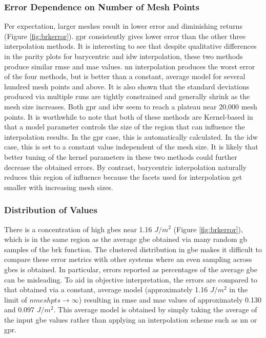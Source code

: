 \documentclass[preprint,12pt]{elsarticle}
\begin{document}
\subsubsection{Error Dependence on Number of Mesh Points} \label{results:general:mesh size}
Per expectation, larger meshes result in lower error and diminishing returns (Figure \ref{fig:brkerror}). \Gls{gpr} consistently gives lower error than the other three interpolation methods. It is interesting to see that despite qualitative differences in the parity plots for barycentric and \gls{idw} interpolation, these two methods produce similar \gls{rmse} and \gls{mae} values. \Gls{nn} interpolation produces the worst error of the four methods, but is better than a constant, average model for several hundred mesh points and above. It is also shown that the standard deviations produced via multiple runs are tightly constrained and generally shrink as the mesh size increases. Both \gls{gpr} and \gls{idw} seem to reach a plateau near 20,000 mesh points. It is worthwhile to note that both of these methods are Kernel-based in that a model parameter controls the size of the region that can influence the interpolation results. In the \gls{gpr} case, this is automatically calculated. In the \gls{idw} case, this is set to a constant value independent of the mesh size. It is likely that better tuning of the kernel parameters in these two methods could further decrease the obtained errors. By contrast, barycentric interpolation naturally reduces this region of influence because the facets used for interpolation get smaller with increasing mesh sizes.

\subsubsection{Distribution of  Values} \label{results:general:distribution}
There is a concentration of high \glspl{gbe} near 1.16 $J/m^2$ (Figure \ref{fig:brkerror}), which is in the same region as the average \gls{gbe} obtained via many random \gls{gb} samples of the \gls{brk} function. The clustered distribution in \gls{gbe} makes it difficult to compare these error metrics with other systems where an even sampling across \glspl{gbe} is obtained. In particular, errors reported as percentages of the average \gls{gbe} can be misleading. To aid in objective interpretation, the errors are compared to that obtained via a constant, average model (approximately 1.16 $J/m^2$ in the limit of $nmeshpts \rightarrow \infty$) resulting in \gls{rmse} and \gls{mae} values of approximately 0.130 and 0.097 $J/m^2$. This average model is obtained by simply taking the average of the input \gls{gbe} values rather than applying an interpolation scheme such as \gls{nn} or \gls{gpr}.
\end{document}
